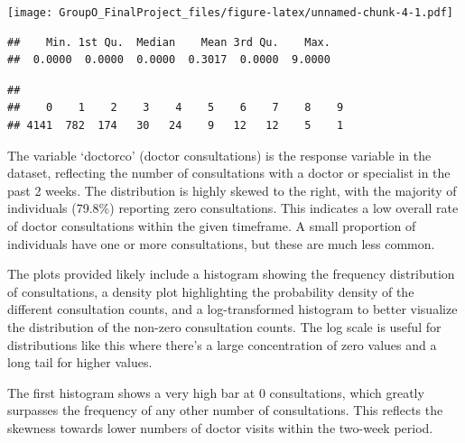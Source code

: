 \documentclass[
]{article}
\newenvironment{Shaded}{\begin{snugshade}}{\end{snugshade}}
\newcommand{\CommentTok}[1]{\textcolor[rgb]{0.56,0.35,0.01}{\textit{#1}}}
\newcommand{\FunctionTok}[1]{\textcolor[rgb]{0.13,0.29,0.53}{\textbf{#1}}}
\newcommand{\NormalTok}[1]{#1}
\newcommand{\SpecialCharTok}[1]{\textcolor[rgb]{0.81,0.36,0.00}{\textbf{#1}}}
\begin{document}
\texttt{[image: GroupO\_FinalProject\_files/figure-latex/unnamed-chunk-4-1.pdf]}

\begin{Shaded}
\end{Shaded}

\begin{verbatim}
##    Min. 1st Qu.  Median    Mean 3rd Qu.    Max. 
##  0.0000  0.0000  0.0000  0.3017  0.0000  9.0000
\end{verbatim}

\begin{Shaded}
\end{Shaded}

\begin{verbatim}
## 
##    0    1    2    3    4    5    6    7    8    9 
## 4141  782  174   30   24    9   12   12    5    1
\end{verbatim}

The variable `doctorco' (doctor consultations) is the response variable
in the dataset, reflecting the number of consultations with a doctor or
specialist in the past 2 weeks. The distribution is highly skewed to the
right, with the majority of individuals (79.8\%) reporting zero
consultations. This indicates a low overall rate of doctor consultations
within the given timeframe. A small proportion of individuals have one
or more consultations, but these are much less common.

The plots provided likely include a histogram showing the frequency
distribution of consultations, a density plot highlighting the
probability density of the different consultation counts, and a
log-transformed histogram to better visualize the distribution of the
non-zero consultation counts. The log scale is useful for distributions
like this where there's a large concentration of zero values and a long
tail for higher values.

The first histogram shows a very high bar at 0 consultations, which
greatly surpasses the frequency of any other number of consultations.
This reflects the skewness towards lower numbers of doctor visits within
the two-week period.
\end{document}
